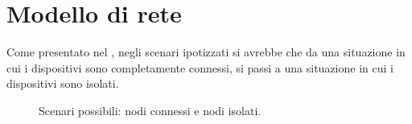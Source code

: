 \section{Modello di rete}
Come presentato nel , negli scenari ipotizzati si avrebbe che da una situazione in cui i dispositivi sono completamente connessi, si passi a una situazione in cui i dispositivi sono isolati.
\begin{figure}[t]
	\hfill
	\caption{Scenari possibili: nodi connessi e nodi isolati.}
	\label{fig:scenari_possibili}
\end{figure}
